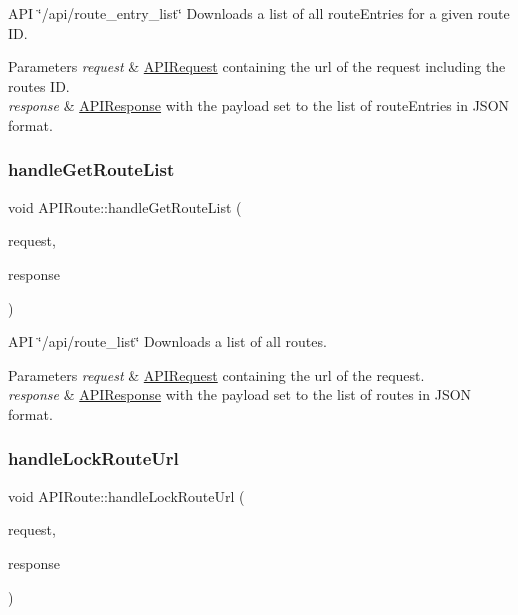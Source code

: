 A\+PI \char`\"{}/api/route\+\_\+entry\+\_\+list\char`\"{} Downloads a list of all route\+Entries for a given route ID. 
\begin{DoxyParams}{Parameters}
{\em request} & \hyperlink{class_a_p_i_request}{A\+P\+I\+Request} containing the url of the request including the routes ID. \\
\hline
{\em response} & \hyperlink{class_a_p_i_response}{A\+P\+I\+Response} with the payload set to the list of route\+Entries in J\+S\+ON format. \\
\hline
\end{DoxyParams}
\mbox{\label{class_a_p_i_route_a62f9b2e4addb8b60087a02a3e93c1abf}} 
\subsubsection{\texorpdfstring{handle\+Get\+Route\+List}{handleGetRouteList}}
{\footnotesize\ttfamily void A\+P\+I\+Route\+::handle\+Get\+Route\+List (\begin{DoxyParamCaption}\item[{const \hyperlink{class_a_p_i_request}{A\+P\+I\+Request} \&}]{request,  }\item[{\hyperlink{class_a_p_i_response}{A\+P\+I\+Response} $\ast$}]{response }\end{DoxyParamCaption})\hspace{0.3cm}{\ttfamily [slot]}}

A\+PI \char`\"{}/api/route\+\_\+list\char`\"{} Downloads a list of all routes. 
\begin{DoxyParams}{Parameters}
{\em request} & \hyperlink{class_a_p_i_request}{A\+P\+I\+Request} containing the url of the request. \\
\hline
{\em response} & \hyperlink{class_a_p_i_response}{A\+P\+I\+Response} with the payload set to the list of routes in J\+S\+ON format. \\
\hline
\end{DoxyParams}
\mbox{\label{class_a_p_i_route_a2edf94cf41f8fba5b1ed5f5eca217968}} 
\subsubsection{\texorpdfstring{handle\+Lock\+Route\+Url}{handleLockRouteUrl}}
{\footnotesize\ttfamily void A\+P\+I\+Route\+::handle\+Lock\+Route\+Url (\begin{DoxyParamCaption}\item[{const \hyperlink{class_a_p_i_request}{A\+P\+I\+Request} \&}]{request,  }\item[{\hyperlink{class_a_p_i_response}{A\+P\+I\+Response} $\ast$}]{response }\end{DoxyParamCaption})\hspace{0.3cm}{\ttfamily [slot]}}

